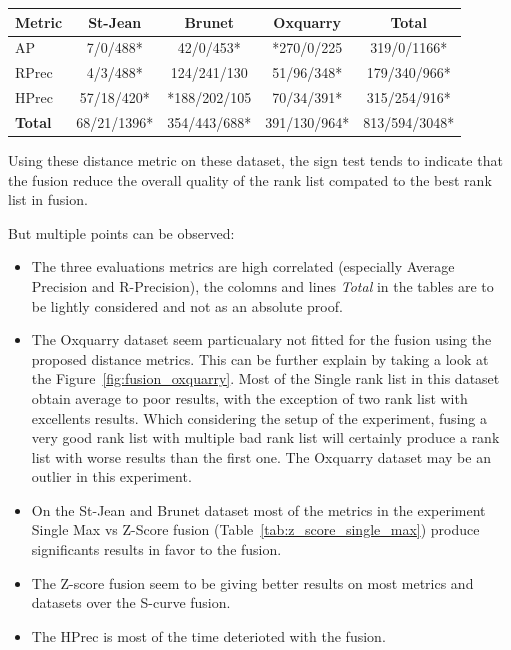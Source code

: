 \begin{table}
  \label{tab:s_curve_z_score}
  \begin{tabular}{l c c c c}
    \toprule
    Metric        & St-Jean     & Brunet       & Oxquarry     & \textbf{Total} \\ \midrule
    AP            & 7/0/488*    & 42/0/453*    & *270/0/225   & 319/0/1166*    \\
    RPrec         & 4/3/488*    & 124/241/130  & 51/96/348*   & 179/340/966*   \\
    HPrec         & 57/18/420*  & *188/202/105 & 70/34/391*   & 315/254/916*   \\
    \textbf{Total}& 68/21/1396* & 354/443/688* & 391/130/964* & 813/594/3048*  \\
    \bottomrule
  \end{tabular}
\end{table}

Using these distance metric on these dataset, the sign test tends to indicate that the fusion reduce the overall quality of the rank list compated to the best rank list in fusion.

But multiple points can be observed:
\begin{itemize}
  \item
  The three evaluations metrics are high correlated (especially Average Precision and R-Precision), the colomns and lines \textit{Total} in the tables are to be lightly considered and not as an absolute proof.
  \item
  The Oxquarry dataset seem particualary not fitted for the fusion using the proposed distance metrics.
  This can be further explain by taking a look at the Figure~\ref{fig:fusion_oxquarry}.
  Most of the Single rank list in this dataset obtain average to poor results, with the exception of two rank list with excellents results.
  Which considering the setup of the experiment, fusing a very good rank list with multiple bad rank list will certainly produce a rank list with worse results than the first one.
  The Oxquarry dataset may be an outlier in this experiment.
  \item
  On the St-Jean and Brunet dataset most of the metrics in the experiment Single Max vs Z-Score fusion (Table~\ref{tab:z_score_single_max}) produce significants results in favor to the fusion.
  \item
  The Z-score fusion seem to be giving better results on most metrics and datasets over the S-curve fusion.
  \item
  The HPrec is most of the time deterioted with the fusion.
\end{itemize}

